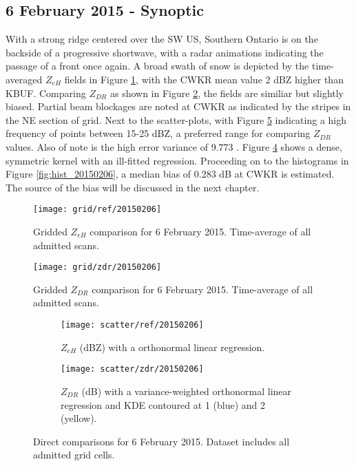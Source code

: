 \subsection{6 February 2015 - Synoptic}
With a strong ridge centered over the SW US, Southern Ontario is on the backside of a progressive shortwave, with a radar animations indicating the passage of a front once again. A
broad swath of snow is depicted by the time-averaged $Z_{eH}$ fields in Figure \ref{fig:grid_ref_20150206}, with the CWKR mean value 2 dBZ higher than KBUF.
Comparing $Z_{DR}$ as shown in Figure \ref{fig:grid_zdr_20150206}, the fields are similiar but slightly biased. Partial beam blockages are noted at CWKR as indicated
by the stripes in the NE section of grid. Next to the scatter-plots, with Figure \ref{fig:scatter_20150206} indicating a high frequency of points between 15-25 dBZ, a preferred range for comparing $Z_{DR}$ values. Also of note is the high error variance of 9.773 .
Figure \ref{fig:scatter_zdr_20150206} shows a dense, symmetric kernel with an ill-fitted regression. Proceeding on to the histograms in Figure
\ref{fig:hist_20150206}, a median bias of 0.283 dB at CWKR is estimated. The source of the bias will be discussed in the next chapter. 
\begin{figure}[H]
\texttt{[image: grid/ref/20150206]}
\caption{Gridded $Z_{eH}$ comparison for 6 February 2015. Time-average of all admitted scans.} 
\label{fig:grid_ref_20150206}
\end{figure}
\begin{figure}[H]
\texttt{[image: grid/zdr/20150206]}
\caption{Gridded $Z_{DR}$ comparison for 6 February 2015. Time-average of all admitted scans.} 
\label{fig:grid_zdr_20150206}
\end{figure}

\begin{figure}[H]
\centering
   \begin{subfigure}[t]{0.48\linewidth} \centering
     \texttt{[image: scatter/ref/20150206]}
     \caption{$Z_{eH}$ (dBZ) with a orthonormal linear regression.}\label{fig:scatter_ref_20150206}
   \end{subfigure}
   \begin{subfigure}[t]{0.48\linewidth} \centering
     \texttt{[image: scatter/zdr/20150206]}
     \caption{$Z_{DR}$ (dB) with a variance-weighted orthonormal linear regression and KDE contoured at 1 (blue) and 2 (yellow).}\label{fig:scatter_zdr_20150206}
   \end{subfigure}
\caption{Direct comparisons for 6 February 2015. Dataset includes all admitted grid cells.} \label{fig:scatter_20150206}
\end{figure}

